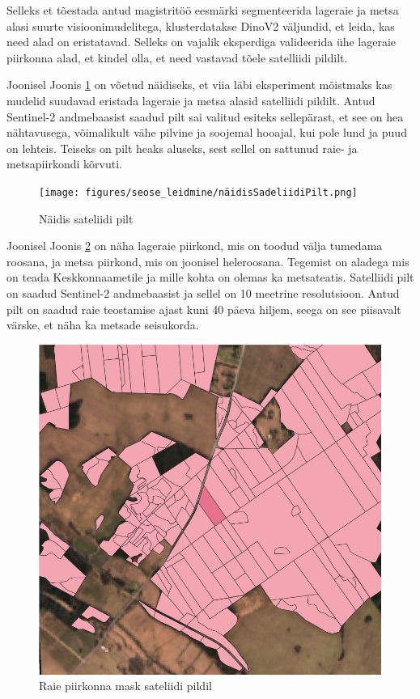 Selleks et tõestada antud magistritöö eesmärki segmenteerida lageraie ja metsa alasi suurte visioonimudelitega, klusterdatakse DinoV2 väljundid, et leida, kas need alad on eristatavad. Selleks on vajalik eksperdiga valideerida ühe lageraie piirkonna alad, et kindel olla, et need vastavad tõele satelliidi pildilt.

Joonisel Joonis \ref{fig:näidisSadeliidiPilt} on võetud näidiseks, et viia läbi eksperiment mõistmaks kas mudelid suudavad eristada lageraie ja metsa alasid satelliidi pildilt. Antud Sentinel-2 andmebaasist saadud pilt sai valitud esiteks sellepärast, et see on hea nähtavusega, võimalikult vähe pilvine ja soojemal hooajal, kui pole lund ja puud on lehteis. Teiseks on pilt heaks aluseks, sest sellel on sattunud raie- ja metsapiirkondi kõrvuti.

\begin{figure}[H]
    \centering
    \texttt{[image: figures/seose\_leidmine/näidisSadeliidiPilt.png]}
    \caption{Näidis sateliidi pilt}
    \label{fig:näidisSadeliidiPilt}
\end{figure}

Joonisel Joonis \ref{fig:raieInfoMask} on näha lageraie piirkond, mis on toodud välja tumedama roosana, ja metsa piirkond, mis on joonisel heleroosana. Tegemist on aladega mis on teada Keskkonnaametile ja mille kohta on olemas ka metsateatis. Satelliidi pilt on saadud Sentinel-2 andmebaasist ja sellel on 10 meetrine resolutsioon. Antud pilt on saadud raie teostamise ajast kuni 40 päeva hiljem, seega on see piisavalt värske, et näha ka metsade seisukorda.

\begin{figure}[H]
    \centering
    \includegraphics[width=.7\textwidth]{figures/seose_leidmine/raieInfoMask.png}
    \caption{Raie piirkonna mask sateliidi pildil}
    \label{fig:raieInfoMask}
\end{figure}

